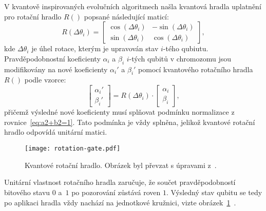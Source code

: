 V kvantově inspirovaných evolučních algoritmech našla kvantová hradla uplatnění pro rotační hradlo $R\left(\right)$ popsané následující maticí:
\begin{equation}\label{eq:rotate-gate}
    R\left(\Delta\theta_i\right) =
    \begin{bmatrix}
        \cos{\left( \Delta\theta_i \right)} & - \sin{\left( \Delta\theta_i \right)} \\
        \sin{\left( \Delta\theta_i \right)} &   \cos{\left( \Delta\theta_i \right)}
    \end{bmatrix},
\end{equation}
kde $\Delta\theta_i$ je úhel rotace, kterým je upravován stav $i$-tého qubiutu. 
Pravděpodobnostní koeficienty $\alpha_i$ a $\beta_i$ $i$-tých qubitů v chromozomu jsou modifikovány na nové koeficienty $\alpha_i'$ a $\beta_i'$ pomocí kvantového rotačního hradla $R\left(\right)$ podle vzorce: 
\begin{equation}\label{eq:rotation-gate-angles}
    \begin{bmatrix}
        \alpha_i' \\
        \beta_i' 
    \end{bmatrix}
    =
    R\left(\Delta\theta_i\right) \cdot
    \begin{bmatrix}
        \alpha_i \\
        \beta_i 
    \end{bmatrix},
\end{equation}
přičemž výsledné nové koeficienty musí splňovat podmínku normalizace z rovnice~\ref{eq:a2+b2=1}. 
Tato podmínka je vždy splněna, jelikož kvantové rotační hradlo odpovídá unitární matici. 
\begin{figure}[ht!]
    \centering
    \texttt{[image: rotation-gate.pdf]}
    \caption{Kvantové rotační hradlo. Obrázek byl převzat s úpravami z~\cite{NaturalComputing}.}
    \label{fig:rotation-gate}
\end{figure}
Unitární vlastnost rotačního hradla zaručuje, že součet pravděpodobností bitového stavu $0$ a~$1$ po pozorování zůstává roven $1$. 
Výsledný stav qubitu se tedy po aplikaci hradla vždy nachází na jednotkové kružnici, vizte obrázek~\ref{fig:rotation-gate}~\cite{NaturalComputing}.

